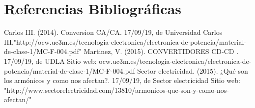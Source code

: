 \documentclass[12pt,a4paper]{article}
\begin{document}
\section{Referencias Bibliográficas}
\begin{flushleft}
Carlos III. (2014). Conversion CA/CA. 17/09/19, de Universidad Carlos III,"http://ocw.uc3m.es/tecnologia-electronica/electronica-de-potencia/material-de-clase-1/MC-F-004.pdf" 
\linebreak
\linebreak
Martinez, V. (2015). CONVERTIDORES CD-CD . 17/09/19, de UDLA Sitio web: ocw.uc3m.es/tecnologia-electronica/electronica-de-potencia/material-de-clase-1/MC-F-004.pdf
\linebreak
\linebreak
Sector electricidad. (2015). ¿Qué son los armónicos y como nos afectan?. 17/09/19, de Sector electricidad Sitio web: "http://www.sectorelectricidad.com/13810/armonicos-que-son-y-como-nos-afectan/"
\linebreak 
\linebreak
\end{flushleft}
% 
% 
\end{document}
